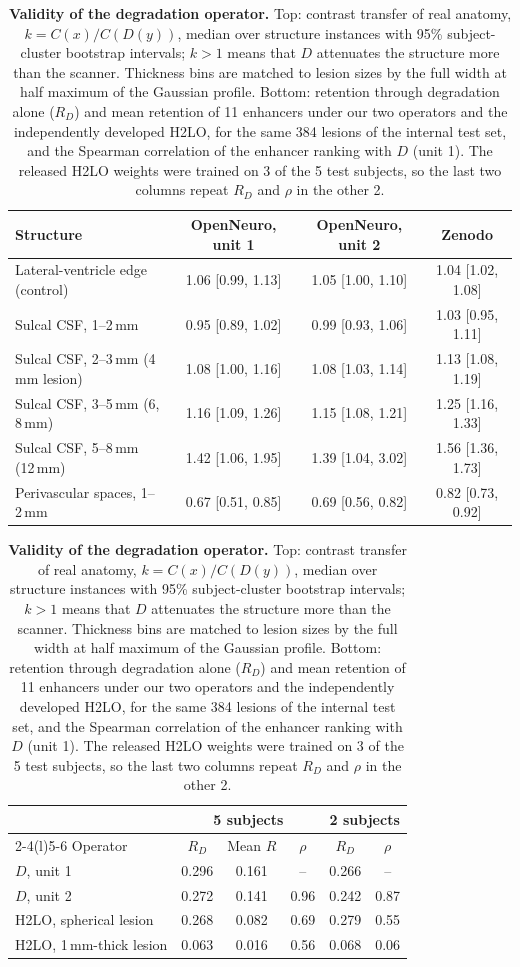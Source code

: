 \begin{table}[!htbp]
{\caption{\textbf{Validity of the degradation operator.} Top: contrast transfer of real anatomy, $k = C(x)/C(D(y))$, median over structure instances with 95\% subject-cluster bootstrap intervals; $k>1$ means that $D$ attenuates the structure more than the scanner. Thickness bins are matched to lesion sizes by the full width at half maximum of the Gaussian profile. Bottom: retention through degradation alone ($R_D$) and mean retention of 11 enhancers under our two operators and the independently developed H2LO, for the same 384 lesions of the internal test set, and the Spearman correlation of the enhancer ranking with $D$ (unit 1). The released H2LO weights were trained on 3 of the 5 test subjects, so the last two columns repeat $R_D$ and $\rho$ in the other 2.}}
{\scriptsize\setlength{\tabcolsep}{3pt}\begin{tabular*}{\linewidth}{@{\extracolsep{\fill}}lccc@{}}
\toprule
Structure & OpenNeuro, unit 1 & OpenNeuro, unit 2 & Zenodo \\
\midrule
Lateral-ventricle edge (control) & 1.06 [0.99, 1.13] & 1.05 [1.00, 1.10] & 1.04 [1.02, 1.08] \\
Sulcal CSF, 1--2\,mm & 0.95 [0.89, 1.02] & 0.99 [0.93, 1.06] & 1.03 [0.95, 1.11] \\
Sulcal CSF, 2--3\,mm (4\,mm lesion) & 1.08 [1.00, 1.16] & 1.08 [1.03, 1.14] & 1.13 [1.08, 1.19] \\
Sulcal CSF, 3--5\,mm (6, 8\,mm) & 1.16 [1.09, 1.26] & 1.15 [1.08, 1.21] & 1.25 [1.16, 1.33] \\
Sulcal CSF, 5--8\,mm (12\,mm) & 1.42 [1.06, 1.95] & 1.39 [1.04, 3.02] & 1.56 [1.36, 1.73] \\
Perivascular spaces, 1--2\,mm & 0.67 [0.51, 0.85] & 0.69 [0.56, 0.82] & 0.82 [0.73, 0.92] \\
\bottomrule
\end{tabular*}
\par\vspace{2ex}
\begin{tabular*}{\linewidth}{@{\extracolsep{\fill}}lccccc@{}}
\toprule
& \multicolumn{3}{c}{5 subjects} & \multicolumn{2}{c}{2 subjects} \\
\cmidrule(lr){2-4}\cmidrule(l){5-6}
Operator & $R_D$ & Mean $R$ & $\rho$ & $R_D$ & $\rho$ \\
\midrule
$D$, unit 1 & 0.296 & 0.161 & -- & 0.266 & -- \\
$D$, unit 2 & 0.272 & 0.141 & 0.96 & 0.242 & 0.87 \\
H2LO, spherical lesion & 0.268 & 0.082 & 0.69 & 0.279 & 0.55 \\
H2LO, 1\,mm-thick lesion & 0.063 & 0.016 & 0.56 & 0.068 & 0.06 \\
\bottomrule
\end{tabular*}}
\end{table}
